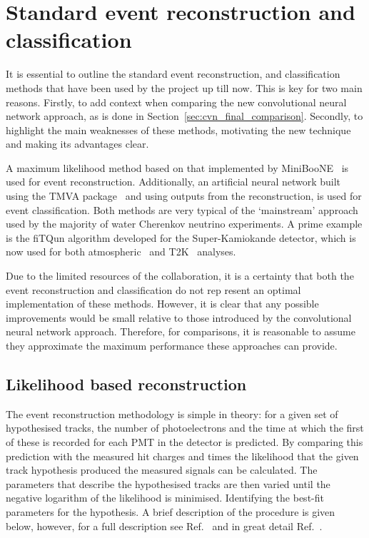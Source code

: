 \section{Standard event reconstruction and classification} %
\label{sec:cvn_old} %

It is essential to outline the standard event reconstruction, and classification methods that have
been used by the \chips project up till now. This is key for two main reasons. Firstly, to add
context when comparing the new convolutional neural network approach, as is done in
Section~\ref{sec:cvn_final_comparison}. Secondly, to highlight the main weaknesses of these
methods, motivating the new technique and making its advantages clear.

A maximum likelihood method based on that implemented by MiniBooNE~\cite{patterson2009} is used
for event reconstruction. Additionally, an artificial neural network built using the TMVA
package~\cite{hocker2007} and using outputs from the reconstruction, is used for event
classification. Both methods are very typical of the `mainstream' approach used by the majority of
water Cherenkov neutrino experiments. A prime example is the fiTQun algorithm developed for the
Super-Kamiokande detector, which is now used for both atmospheric~\cite{jiang2019} and
T2K~\cite{missert2017} analyses.

Due to the limited resources of the \chips collaboration, it is a certainty that both the event
reconstruction and classification do not rep resent an optimal implementation of these methods.
However, it is clear that any possible improvements would be small relative to those introduced by
the convolutional neural network approach. Therefore, for comparisons, it is reasonable to assume
they approximate the maximum performance these approaches can provide.

\subsection{Likelihood based reconstruction} %
\label{sec:cvn_old_reco} %

The event reconstruction methodology is simple in theory: for a given set of hypothesised tracks,
the number of photoelectrons and the time at which the first of these is recorded for each PMT in
the detector is predicted. By comparing this prediction with the measured hit charges and times
the likelihood that the given track hypothesis produced the measured signals can be calculated.
The parameters that describe the hypothesised tracks are then varied until the negative logarithm
of the likelihood is minimised. Identifying the best-fit parameters for the hypothesis. A brief
description of the procedure is given below, however, for a full description see
Ref.~\cite{blake2016} and in great detail Ref.~\cite{perch2017}.

